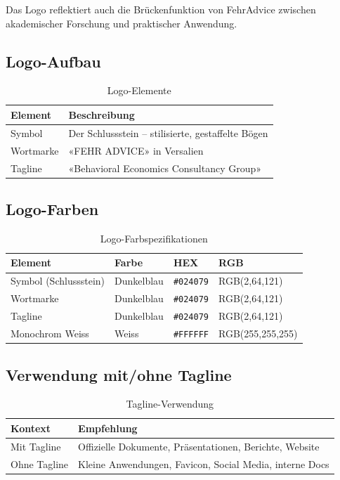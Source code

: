 Das Logo reflektiert auch die Brückenfunktion von FehrAdvice zwischen
akademischer Forschung und praktischer Anwendung.

\subsection{Logo-Aufbau}

\begin{table}[h]
\centering
\caption{Logo-Elemente}
\label{tab:logo-elements}
\begin{tabular}{ll}
\toprule
\textbf{Element} & \textbf{Beschreibung} \\
\midrule
Symbol & Der Schlussstein – stilisierte, gestaffelte Bögen \\
Wortmarke & «FEHR ADVICE» in Versalien \\
Tagline & «Behavioral Economics Consultancy Group» \\
\bottomrule
\end{tabular}
\end{table}

\subsection{Logo-Farben}

\begin{table}[h]
\centering
\caption{Logo-Farbspezifikationen}
\label{tab:logo-colors}
\begin{tabular}{llll}
\toprule
\textbf{Element} & \textbf{Farbe} & \textbf{HEX} & \textbf{RGB} \\
\midrule
Symbol (Schlussstein) & Dunkelblau & \texttt{\#024079} & RGB(2,64,121) \\
Wortmarke & Dunkelblau & \texttt{\#024079} & RGB(2,64,121) \\
Tagline & Dunkelblau & \texttt{\#024079} & RGB(2,64,121) \\
Monochrom Weiss & Weiss & \texttt{\#FFFFFF} & RGB(255,255,255) \\
\bottomrule
\end{tabular}
\end{table}

\subsection{Verwendung mit/ohne Tagline}

\begin{table}[h]
\centering
\caption{Tagline-Verwendung}
\label{tab:tagline-usage}
\begin{tabular}{ll}
\toprule
\textbf{Kontext} & \textbf{Empfehlung} \\
\midrule
Mit Tagline & Offizielle Dokumente, Präsentationen, Berichte, Website \\
Ohne Tagline & Kleine Anwendungen, Favicon, Social Media, interne Docs \\
\bottomrule
\end{tabular}
\end{table}

